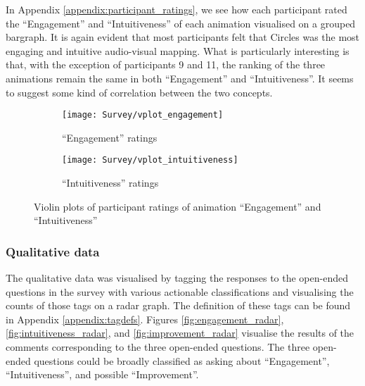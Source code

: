 \documentclass[../initial_thesis.tex]{subfiles}
\begin{document}
In Appendix \ref{appendix:participant_ratings}, we see how each participant rated the ``Engagement'' and ``Intuitiveness'' of each animation visualised on a grouped bargraph. It is again evident that most participants felt that Circles was the most engaging and intuitive audio-visual mapping. What is particularly interesting is that, with the exception of participants 9 and 11, the ranking of the three animations remain the same in both ``Engagement'' and ``Intuitiveness''. It seems to suggest some kind of correlation between the two concepts.

\begin{figure}
  \begin{subfigure}{0.5\textwidth}
    \centering
    \texttt{[image: Survey/vplot\_engagement]}
    \caption{``Engagement'' ratings}
    \label{fig:engagement_ratings}
  \end{subfigure}
  \begin{subfigure}{0.5\textwidth}
    \centering
    \texttt{[image: Survey/vplot\_intuitiveness]}
    \caption{``Intuitiveness'' ratings}
    \label{fig:intuitive_ratings}
  \end{subfigure}
  \caption{Violin plots of participant ratings of animation ``Engagement'' and ``Intuitiveness''}
  \label{fig:vplot_ratings}
\end{figure}

\subsubsection{Qualitative data}
The qualitative data was visualised by tagging the responses to the open-ended questions in the survey with various actionable classifications and visualising the counts of those tags on a radar graph. The definition of these tags can be found in Appendix \ref{appendix:tagdefs}. Figures \ref{fig:engagement_radar}, \ref{fig:intuitiveness_radar}, and \ref{fig:improvement_radar} visualise the results of the comments corresponding to the three open-ended questions. The three open-ended questions could be broadly classified as asking about ``Engagement'', ``Intuitiveness'', and possible ``Improvement''.
\end{document}
